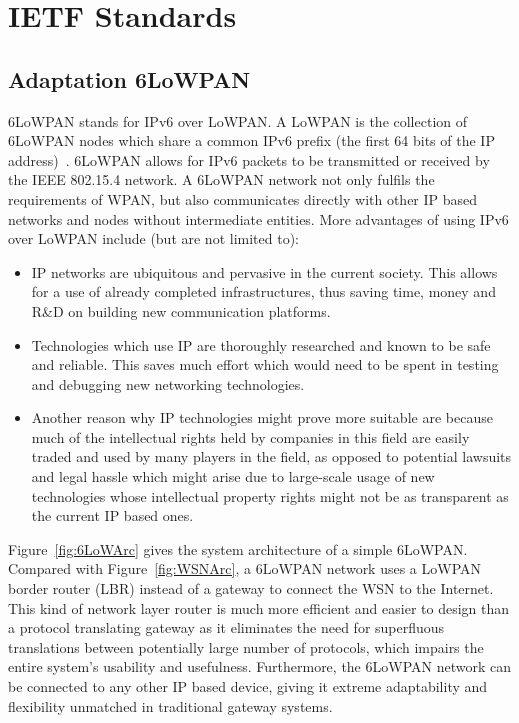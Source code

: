 \chapter{IETF Standards}
\label{Standards}


\section{Adaptation 6LoWPAN}
\label{Intr:6LoWPAN}


6LoWPAN stands for IPv6 over LoWPAN. A LoWPAN is the collection of 6LoWPAN nodes which share a common IPv6 prefix (the first 64 bits of the IP address)~\cite{ShelbyBormann2009}. 6LoWPAN allows for IPv6 packets to be transmitted or received by the IEEE 802.15.4 network. A 6LoWPAN network not only fulfils the requirements of WPAN, but also communicates directly with other IP based networks and nodes without intermediate entities. More advantages of using IPv6 over LoWPAN include (but are not limited to):  
\begin{itemize}
\item IP networks are ubiquitous and pervasive in the current society.  This allows for a use of already completed infrastructures, thus saving time, money and R\&D on building new communication platforms. 
\item Technologies which use IP are thoroughly researched and known to be safe and reliable.  This saves much effort which would need to be spent in testing and debugging new networking technologies. 
\item Another reason why IP technologies might prove more suitable are because much of the intellectual rights held by companies in this field are easily traded and used by many players in the field, as opposed to potential lawsuits and legal hassle which might arise due to large-scale usage of new technologies whose intellectual property rights might not be as transparent as the current IP based ones.
\end{itemize}

Figure~\ref{fig:6LoWArc} gives the system architecture of a simple 6LoWPAN\@. Compared with  Figure~\ref{fig:WSNArc}, a 6LoWPAN network uses a LoWPAN border router (LBR) instead of a gateway  to connect  the WSN to the Internet. This kind of network layer router is much more efficient and easier to design than a protocol translating gateway as it eliminates the need for superfluous translations between potentially large number of protocols, which impairs the entire system's usability and usefulness. Furthermore, the 6LoWPAN network can be connected to any other IP based device, giving it extreme adaptability and flexibility unmatched in traditional gateway systems. 
\newline

